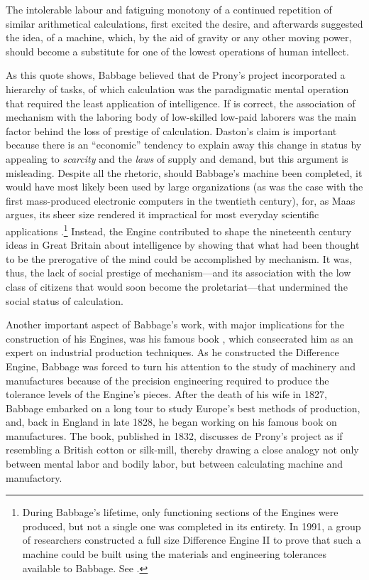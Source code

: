 \documentclass[version=last,draft=false,paper=A4,portrait,twoside=true,twocolumn=false,headinclude=false,footinclude=false,mpinclude=true,fontsize=12,BCOR=20mm,DIV=calc,pagesize=auto,open=right,chapterprefix=true,numbers=autoendperiod,headsepline=false,headings=twolinechapter,parskip=false]{scrbook}
\begin{document}
\begin{displayquote}
The intolerable labour and fatiguing monotony of a continued repetition of
similar arithmetical calculations, first excited the desire, and afterwards
suggested the idea, of a machine, which, by the aid of gravity or any other
moving power, should become a substitute for one of the lowest operations
of human intellect.
\end{displayquote}

As this quote shows, Babbage believed that de Prony's project incorporated
a hierarchy of tasks, of which calculation was the paradigmatic mental
operation that required the least application of intelligence. If
\textcite{daston1994} is correct, the association of mechanism with the
laboring body of low-skilled low-paid laborers was the main factor behind
the loss of prestige of calculation. Daston's claim is important because
there is an ``economic'' tendency to explain away this change in status by
appealing to \emph{scarcity} and the \emph{laws} of supply and demand, but this argument
is misleading. Despite all the rhetoric, should Babbage's machine been
completed, it would have most likely been used by large organizations (as
was the case with the first mass-produced electronic computers in the
twentieth century), for, as Maas argues, its sheer size rendered it
impractical for most everyday scientific applications
\autocite[p. 103]{maas2005}.\footnote{During Babbage's lifetime, only functioning sections of the Engines
were produced, but not a single one was completed in its entirety. In 1991,
a group of researchers constructed a full size Difference Engine II to
prove that such a machine could be built using the materials and
engineering tolerances available to Babbage. See \textcite{swade2000}.} Instead, the Engine contributed to
shape the nineteenth century ideas in Great Britain about intelligence by
showing that what had been thought to be the prerogative of the mind could
be accomplished by mechanism. It was, thus, the lack of social prestige of
mechanism---and its association with the low class of citizens that would
soon become the proletariat---that undermined the social status of
calculation.

Another important aspect of Babbage's work, with major implications for the
construction of his Engines, was his famous book
, which consecrated him as an expert on
industrial production techniques. As he constructed the Difference Engine,
Babbage was forced to turn his attention to the study of machinery and
manufactures because of the precision engineering required to produce the
tolerance levels of the Engine's pieces. After the death of his wife in
1827, Babbage embarked on a long tour to study Europe's best methods of
production, and, back in England in late 1828, he began working on his
famous book on manufactures. The book, published in 1832, discusses de
Prony's project as if resembling a British cotton or silk-mill, thereby
drawing a close analogy not only between mental labor and bodily labor, but
between calculating machine and manufactory.
\end{document}
